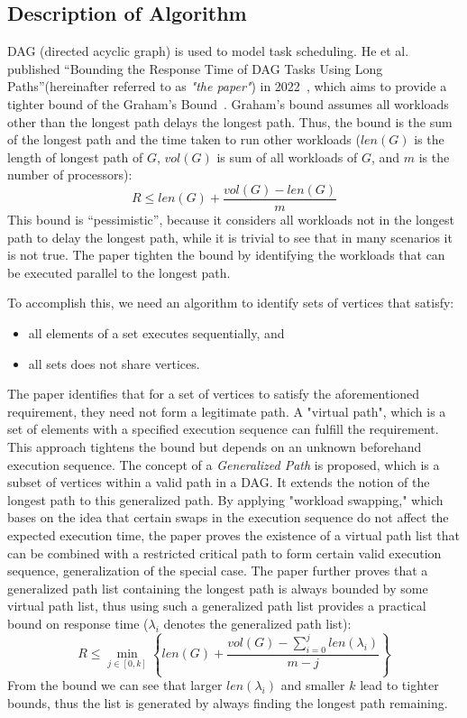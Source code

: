 \documentclass[./report.tex]{subfiles}
\begin{document}
\subsection{Description of Algorithm}%

DAG (directed acyclic graph) is used to model task scheduling. He et al. published ``Bounding the Response Time of DAG Tasks Using Long Paths''(hereinafter referred to as \textit{"the paper"}) in 2022~\cite{heBoundingResponseTime2022}, which aims to provide a tighter bound of the Graham's Bound~\cite{grahamBoundsMultiprocessingTiming1969}. Graham's bound assumes all workloads other than the longest path delays the longest path. Thus, the bound is the sum of the longest path and the time taken to run other workloads ($len(G)$ is the length of longest path of $G$, $vol(G)$ is sum of all workloads of $G$, and $m$ is the number of processors):
\begin{equation}
   R\leq len(G)+\frac{vol(G)-len(G)}{m} 
\end{equation}
This bound is ``pessimistic'', because it considers all workloads not in the longest path to delay the longest path, while it is trivial to see that in many scenarios it is not true. The paper tighten the bound by identifying the workloads that can be executed parallel to the longest path.

To accomplish this, we need an algorithm to identify sets of vertices that satisfy:
\begin{itemize}
   \item all elements of a set executes sequentially, and
   \item all sets does not share vertices.
\end{itemize}

The paper identifies that for a set of vertices to satisfy the aforementioned requirement, they need not form a legitimate path. A "virtual path", which is a set of elements with a specified execution sequence can fulfill the requirement. This approach tightens the bound but depends on an unknown beforehand execution sequence. The concept of a \textit{Generalized Path} is proposed, which is a subset of vertices within a valid path in a DAG. It extends the notion of the longest path to this generalized path. By applying "workload swapping," which bases on the idea that certain swaps in the execution sequence do not affect the expected execution time, the paper proves the existence of a virtual path list that can be combined with a restricted critical path to form certain valid execution sequence, generalization of the special case. The paper further proves that a generalized path list containing the longest path is always bounded by some virtual path list, thus using such a generalized path list provides a practical bound on response time ($\lambda_i$ denotes the generalized path list):
\begin{equation}
   \label{eq:bound}
   R\leq\operatorname*{min}_{j\in[0,k]}\left\{l e n(G)+{\frac{v o l(G)-\sum_{i=0}^{j}l e n(\lambda_{i})}{m-j}}\right\}
\end{equation}
From the bound we can see that larger $len(\lambda_i)$ and smaller $k$ lead to tighter bounds, thus the list is generated by always finding the longest path remaining.
\end{document}
